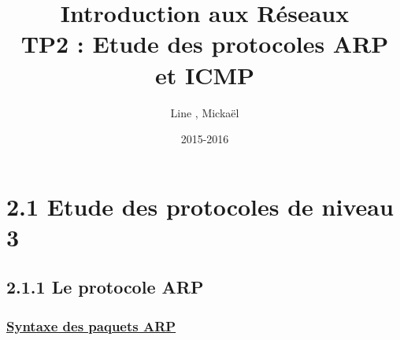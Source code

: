 \documentclass{article}
\title{Introduction aux Réseaux\\TP2 : Etude des protocoles ARP et ICMP}
\author{Line \bsc{POUVARET}, Mickaël \bsc{TURNEL}}
\date{2015-2016}
\begin{document}
\maketitle

\section*{2.1 Etude des protocoles de niveau 3}

\subsection*{2.1.1 Le protocole ARP}

\subsubsection*{\underline{Syntaxe des paquets ARP}}
\end{document}
